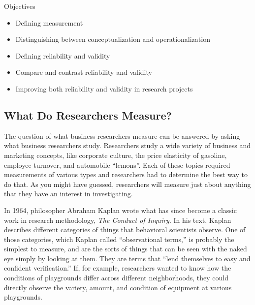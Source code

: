 \begin{center}
	\begin{objbox}{Objectives}
		\begin{itemize}
			\setlength{\itemsep}{0pt}
			\setlength{\parskip}{0pt}
			\setlength{\parsep}{0pt}
			
			\item Defining measurement
			\item Distinguishing between conceptualization and operationalization
			\item Defining reliability and validity 
			\item Compare and contrast reliability and validity
			\item Improving both reliability and validity in research projects
		\end{itemize}
	\end{objbox}
\end{center}

\subsection{What Do Researchers Measure?}

The question of what business researchers measure can be answered by asking what business researchers study. Researchers study a wide variety of business and marketing concepts, like corporate culture\cite{denison1990corporate}, the price elasticity of gasoline\cite{hughes2006evidence}, employee turnover\cite{hom1995employee}, and automobile ``lemons''\cite{akerlof1978market}. Each of these topics required measurements of various types and researchers had to determine the best way to do that. As you might have guessed, researchers will measure just about anything that they have an interest in investigating. 

In 1964, philosopher Abraham Kaplan wrote what has since become a classic work in research methodology, \textit{The Conduct of Inquiry}\cite{kaplan2017conduct}. In his text, Kaplan describes different categories of things that behavioral scientists observe. One of those categories, which Kaplan called ``observational terms,'' is probably the simplest to measure, and are the sorts of things that can be seen with the naked eye simply by looking at them. They are terms that ``lend themselves to easy and confident verification.'' If, for example, researchers wanted to know how the conditions of playgrounds differ across different neighborhoods, they could directly observe the variety, amount, and condition of equipment at various playgrounds.

